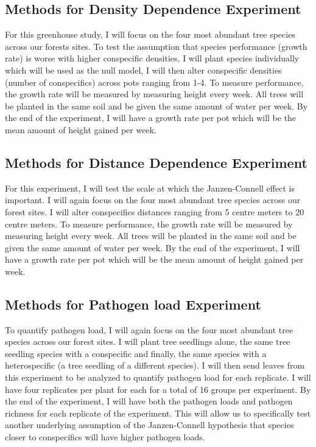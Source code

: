 \documentclass{article}
\begin{document}
\subsection{Methods for Density Dependence Experiment}
For this greenhouse study, I will focus on the four most abundant tree species across our forests sites. To test the assumption that species performance (growth rate) is worse with higher conspecific densities, I will plant species individually which will be used as the null model, I will then alter conspecific densities (number of conspecifics) across pots ranging from 1-4. To measure performance, the growth rate will be measured by measuring height every week. All trees will be planted in the same soil and be given the same amount of water per week. By the end of the experiment, I will have a growth rate per pot which will be the mean amount of height gained per week.   

\subsection{Methods for Distance Dependence Experiment}
For this experiment, I will test the scale at which the Janzen-Connell effect is important. I will again focus on the four most abundant tree species across our forest sites. I will alter conspecifics distances ranging from 5 centre meters to 20 centre meters. To measure performance, the growth rate will be measured by measuring height every week. All trees will be planted in the same soil and be given the same amount of water per week. By the end of the experiment, I will have a growth rate per pot which will be the mean amount of height gained per week.

\subsection{Methods for Pathogen load Experiment}
To quantify pathogen load, I will again focus on the four most abundant tree species across our forest sites. I will plant tree seedlings alone, the same tree seedling species with a conspecific and finally, the same species with a heterospecific (a tree seedling of a different species). I will then send leaves from this experiment to be analyzed to quantify pathogen load for each replicate. I will have four replicates per plant for each for a total of 16 groups per experiment. By the end of the experiment, I will have both the pathogen loads and pathogen richness for each replicate of the experiment. This will allow us to specifically test another underlying assumption of the Janzen-Connell hypothesis that species closer to conspecifics will have higher pathogen loads.
\end{document}
